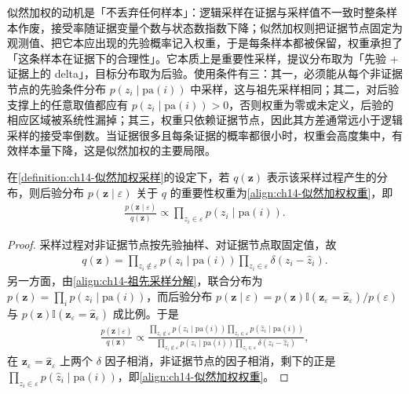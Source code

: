 \documentclass[../../main.tex]{subfiles}
\begin{document}
\begin{remark}似然加权的动机是「不丢弃任何样本」：逻辑采样在证据与采样值不一致时整条样本作废，接受率随证据变量个数与状态数指数下降；似然加权则把证据节点固定为观测值、把它本应出现的先验概率记入权重，于是每条样本都被保留，权重承担了「这条样本在证据下的合理性」。它本质上是重要性采样，提议分布取为「先验 + 证据上的 delta」，目标分布取为后验。使用条件有三：其一，必须能从每个非证据节点的先验条件分布 $p\!\left(z_{i}\mid\mathrm{pa}(i)\right)$ 中采样，这与祖先采样相同；其二，对后验支撑上的任意取值都应有 $p\!\left(z_{i}\mid\mathrm{pa}(i)\right)>0$，否则权重为零或未定义，后验的相应区域被系统性漏掉；其三，权重只依赖证据节点，因此其方差通常远小于逻辑采样的接受率倒数。当证据很多且每条证据的概率都很小时，权重会高度集中，有效样本量下降，这是似然加权的主要局限。\end{remark}

\begin{proposition}[似然加权采样的权重]\label{proposition:ch14-似然加权权重}
在\cref{definition:ch14-似然加权采样}的设定下，若 $q(\bm{z})$ 表示该采样过程产生的分布，则后验分布 $p\!\left(\bm{z}\mid\varepsilon\right)$ 关于 $q$ 的重要性权重为\eqref{align:ch14-似然加权权重}，即
\begin{align*}
\frac{p\!\left(\bm{z}\mid\varepsilon\right)}{q(\bm{z})}\propto\prod_{z_{i}\in\varepsilon}p\!\left(z_{i}\mid\mathrm{pa}(i)\right).
\end{align*}
\end{proposition}

\begin{proof}
采样过程对非证据节点按先验抽样、对证据节点取固定值，故
\begin{align*}
q(\bm{z})=\prod_{z_{i}\notin\varepsilon}p\!\left(z_{i}\mid\mathrm{pa}(i)\right)\prod_{z_{i}\in\varepsilon}\delta\!\left(z_{i}-\hat{z}_{i}\right).
\end{align*}
另一方面，由\eqref{align:ch14-祖先采样分解}，联合分布为 $p(\bm{z})=\prod_{i}p\!\left(z_{i}\mid\mathrm{pa}(i)\right)$，而后验分布 $p\!\left(\bm{z}\mid\varepsilon\right)=p(\bm{z})\mathbb{I}\left(\bm{z}_{\varepsilon}=\hat{\bm{z}}_{\varepsilon}\right)/p(\varepsilon)$ 与 $p(\bm{z})\mathbb{I}\left(\bm{z}_{\varepsilon}=\hat{\bm{z}}_{\varepsilon}\right)$ 成比例。于是
\begin{align*}
\frac{p\!\left(\bm{z}\mid\varepsilon\right)}{q(\bm{z})}\propto\frac{\prod_{z_{i}\notin\varepsilon}p\!\left(z_{i}\mid\mathrm{pa}(i)\right)\prod_{z_{i}\in\varepsilon}p\!\left(\hat{z}_{i}\mid\mathrm{pa}(i)\right)}{\prod_{z_{i}\notin\varepsilon}p\!\left(z_{i}\mid\mathrm{pa}(i)\right)\prod_{z_{i}\in\varepsilon}\delta\!\left(z_{i}-\hat{z}_{i}\right)},
\end{align*}
在 $\bm{z}_{\varepsilon}=\hat{\bm{z}}_{\varepsilon}$ 上两个 $\delta$ 因子相消，非证据节点的因子相消，剩下的正是 $\prod_{z_{i}\in\varepsilon}p\!\left(\hat{z}_{i}\mid\mathrm{pa}(i)\right)$，即\eqref{align:ch14-似然加权权重}。
\end{proof}
\end{document}
